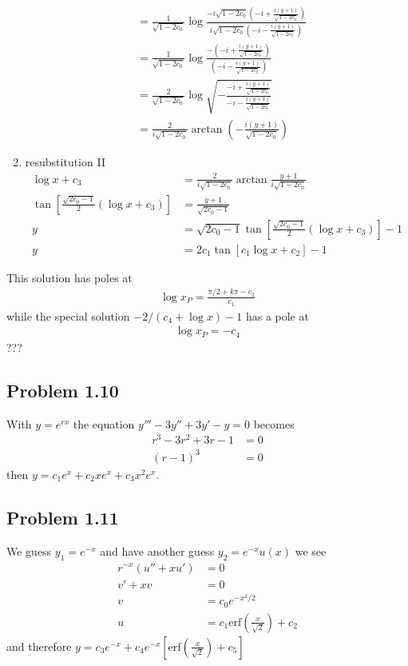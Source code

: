 \documentclass[10pt,a4paper]{book}
\theoremstyle{definition}
\begin{document}
\begin{enumerate}
\begin{align}
        &=\frac{1}{\sqrt{1-2c_0}}\log\frac{-i\sqrt{1-2c_0}\left(-i+\frac{i(y+1)}{\sqrt{1-2c_0}}\right)}{i\sqrt{1-2c_0}\left(-i-\frac{i(y+1)}{\sqrt{1-2c_0}}\right)}\\
        &=\frac{1}{\sqrt{1-2c_0}}\log\frac{-\left(-i+\frac{i(y+1)}{\sqrt{1-2c_0}}\right)}{\left(-i-\frac{i(y+1)}{\sqrt{1-2c_0}}\right)}\\
        &=\frac{2}{\sqrt{1-2c_0}}\log\sqrt{-\frac{-i+\frac{i(y+1)}{\sqrt{1-2c_0}}}{-i-\frac{i(y+1)}{\sqrt{1-2c_0}}}}\\
        &=\frac{2}{i\sqrt{1-2c_0}}\arctan\left(-\frac{i(y+1)}{\sqrt{1-2c_0}}\right)
    \end{align}
    \item resubstitution II
    \begin{align}
        \log x+c_3&=\frac{2}{i\sqrt{1-2c_0}}\arctan \frac{y+1}{i\sqrt{1-2c_0}}\\
        \tan\left[\frac{\sqrt{2c_0-1}}{2}(\log x+c_3)\right]&=\frac{y+1}{\sqrt{2c_0-1}}\\
        y&=\sqrt{2c_0-1}\tan\left[\frac{\sqrt{2c_0-1}}{2}(\log x+c_3)\right]-1\\
        y&=2c_1\tan\left[c_1\log x+c_2\right]-1
    \end{align}

\end{enumerate}
This solution has poles at
\begin{align}
    \log x_P =\frac{\pi/2+k\pi-c_2}{c_1}
\end{align}
while the special solution $-2/(c_4+\log x)-1$ has a pole at
\begin{align}
    \log x_P=-c_4
\end{align}
???

\subsection{Problem 1.10}
With $y=e^{rx}$ the equation $y'''-3y''+3y'-y=0$ becomes
\begin{align}
    r^3-3r^2+3r-1&=0\\
    (r-1)^3&=0
\end{align}
then $y=c_1e^x+c_2xe^x+c_3x^2e^x$.

\subsection{Problem 1.11}
We guess $y_1=e^{-x}$ and have another guess  $y_2=e^{-x}u(x)$ we see
\begin{align}
    r^{-x}\left(u''+xu'\right)&=0\\
    v'+xv&=0\\
    v&=c_0e^{-x^2/2}\\
    u&=c_1\text{erf}\left(\frac{x}{\sqrt{2}}\right)+c_2
\end{align}
and therefore $y=c_3e^{-x}+c_4e^{-x}\left[\text{erf}\left(\frac{x}{\sqrt{2}}\right)+c_5\right]$
\end{document}

